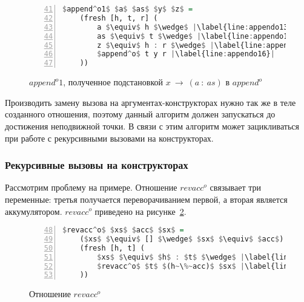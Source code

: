 \begin{figure}[h!]
  \begin{center}
  \begin{minipage}{0.4\textwidth}
  \begin{lstlisting}[language=Haskell, frame=single, numbers=left,numberstyle=\small, firstnumber=41, escapechar=|]
  $append^o1$ $a$ $as$ $y$ $z$ =
    (fresh [h, t, r] (
        a $\equiv$ h $\wedge$ |\label{line:appendo13}|
        as $\equiv$ t $\wedge$ |\label{line:appendo14}|
        z $\equiv$ h : r $\wedge$ |\label{line:appendo15}|
        $append^o$ t y r |\label{line:appendo16}|
    ))
    \end{lstlisting}
  \end{minipage}
  \end{center}
  \caption{$append^o1$, полученное подстановкой $x~\rightarrow~(a~:~as)$ в $append^o$}
  \label{lst:appendo1}
\end{figure}

Производить замену вызова на аргументах-конструкторах нужно так же в теле созданного отношения, поэтому данный алгоритм должен запускаться до достижения неподвижной точки.
В связи с этим алгоритм может зацикливаться при работе с рекурсивными вызовами на конструкторах.


\subsubsection{Рекурсивные вызовы на конструкторах}

Рассмотрим проблему на примере.
Отношение $revacc^o$ связывает три переменные: третья получается переворачиванием первой, а вторая является аккумулятором.
$revacc^o$ приведено на рисунке~\ref{lst:revacco}.

\begin{figure}[h!]
  \begin{center}
  \begin{minipage}{0.4\textwidth}
  \begin{lstlisting}[language=Haskell, frame=single, numbers=left,numberstyle=\small, firstnumber=48, escapechar=|]
  $revacc^o$ $xs$ $acc$ $sx$ =
    ($xs$ $\equiv$ [] $\wedge$ $sx$ $\equiv$ $acc$) $\vee$ |\label{line:revacco2}|
    (fresh [h, t] (
        $xs$ $\equiv$ $h$ : $t$ $\wedge$ |\label{line:revacco4}|
        $revacc^o$ $t$ $(h~\%~acc)$ $sx$ |\label{line:revacco5}|
    ))
    \end{lstlisting}
  \end{minipage}
  \end{center}
  \caption{Отношение $revacc^o$}
  \label{lst:revacco}
\end{figure}

